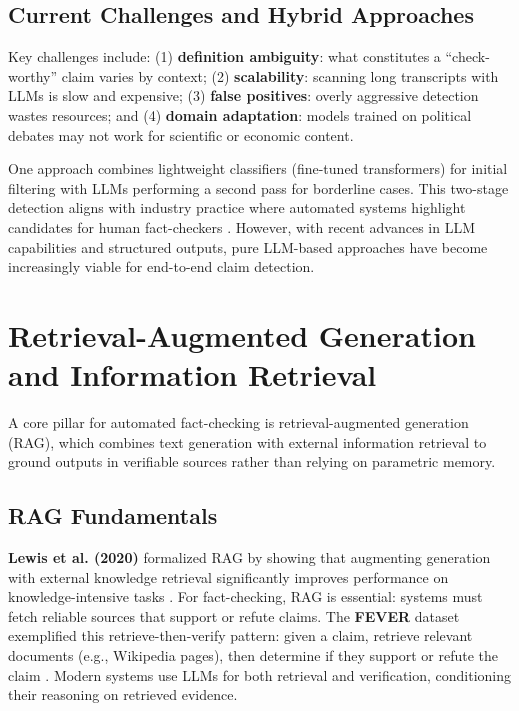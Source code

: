 \documentclass[12pt,a4paper]{article}
\begin{document}
\subsection{Current Challenges and Hybrid Approaches}

Key challenges include: (1) \textbf{definition ambiguity}: what constitutes a ``check-worthy'' claim varies by context; (2) \textbf{scalability}: scanning long transcripts with LLMs is slow and expensive; (3) \textbf{false positives}: overly aggressive detection wastes resources; and (4) \textbf{domain adaptation}: models trained on political debates may not work for scientific or economic content.

One approach combines lightweight classifiers (fine-tuned transformers) for initial filtering with LLMs performing a second pass for borderline cases. This two-stage detection aligns with industry practice where automated systems highlight candidates for human fact-checkers \citep{hassan2021claimbuster}. However, with recent advances in LLM capabilities and structured outputs, pure LLM-based approaches have become increasingly viable for end-to-end claim detection.

\section{Retrieval-Augmented Generation and Information Retrieval}

A core pillar for automated fact-checking is retrieval-augmented generation (RAG), which combines text generation with external information retrieval to ground outputs in verifiable sources rather than relying on parametric memory.

\subsection{RAG Fundamentals}

\textbf{Lewis et al. (2020)} formalized RAG by showing that augmenting generation with external knowledge retrieval significantly improves performance on knowledge-intensive tasks \citep{lewis2020retrieval}. For fact-checking, RAG is essential: systems must fetch reliable sources that support or refute claims. The \textbf{FEVER} dataset exemplified this retrieve-then-verify pattern: given a claim, retrieve relevant documents (e.g., Wikipedia pages), then determine if they support or refute the claim \citep{thorne2018fever}. Modern systems use LLMs for both retrieval and verification, conditioning their reasoning on retrieved evidence.
\end{document}

